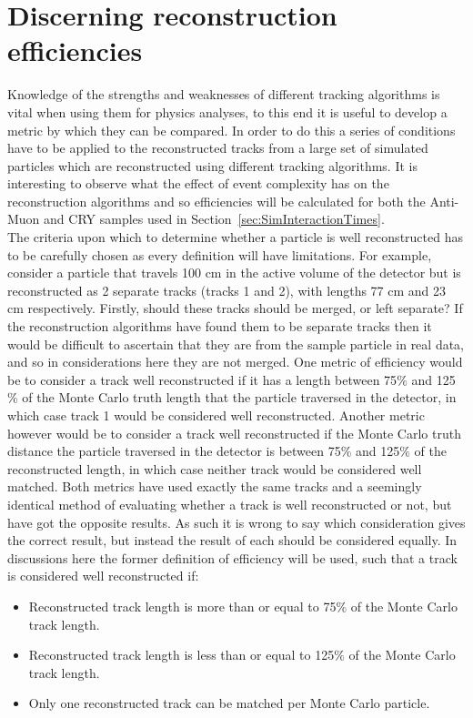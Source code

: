 \section{Discerning reconstruction efficiencies} \label{sec:SimRecoEffic} %
Knowledge of the strengths and weaknesses of different tracking algorithms is vital when using them for physics analyses, to this end it is useful to develop a metric by which they can be compared. In order to do this a series of conditions have to be applied to the reconstructed tracks from a large set of simulated particles which are reconstructed using different tracking algorithms. It is interesting to observe what the effect of event complexity has on the reconstruction algorithms and so efficiencies will be calculated for both the Anti-Muon and CRY samples used in Section~\ref{sec:SimInteractionTimes}. \\

The criteria upon which to determine whether a particle is well reconstructed has to be carefully chosen as every definition will have limitations. For example, consider a particle that travels 100 cm in the active volume of the detector but is reconstructed as 2 separate tracks (tracks 1 and 2), with lengths 77 cm and 23 cm respectively. Firstly, should these tracks should be merged, or left separate? If the reconstruction algorithms have found them to be separate tracks then it would be difficult to ascertain that they are from the sample particle in real data, and so in considerations here they are not merged. One metric of efficiency would be to consider a track well reconstructed if it has a length between 75$\%$ and 125$\%$ of the Monte Carlo truth length that the particle traversed in the detector, in which case track 1 would be considered well reconstructed. Another metric however would be to consider a track well reconstructed if the Monte Carlo truth distance the particle traversed in the detector is between 75$\%$ and 125$\%$ of the reconstructed length, in which case neither track would be considered well matched. Both metrics have used exactly the same tracks and a seemingly identical method of evaluating whether a track is well reconstructed or not, but have got the opposite results. As such it is wrong to say which consideration gives the correct result, but instead the result of each should be considered equally. In discussions here the former definition of efficiency will be used, such that a track is considered well reconstructed if:
\begin{itemize}
\item Reconstructed track length is more than or equal to 75$\%$ of the Monte Carlo track length.
\item Reconstructed track length is less than or equal to 125$\%$ of the Monte Carlo track length.
\item Only one reconstructed track can be matched per Monte Carlo particle.
\end{itemize}

